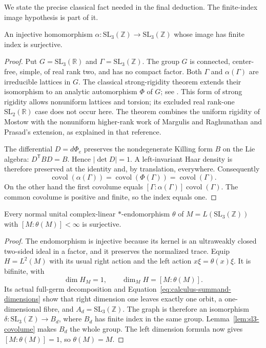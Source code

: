We state the precise classical fact needed in the final deduction.
The finite-index image hypothesis is part of it.
\begin{lemma}\label{lem:sl3-covolume}
An injective homomorphism
$\alpha:\mathrm{SL}_3(\mathbb Z)\to\mathrm{SL}_3(\mathbb Z)$
whose image has finite index is surjective.
\end{lemma}
\begin{proof}
Put $G=\mathrm{SL}_3(\mathbb R)$ and $\Gamma=\mathrm{SL}_3(\mathbb Z)$.
The group $G$ is connected, center-free, simple, of real rank two, and
has no compact factor. Both $\Gamma$ and $\alpha(\Gamma)$ are
irreducible lattices in $G$. The classical strong-rigidity theorem
extends their isomorphism to an analytic automorphism $\Phi$ of $G$;
see \cite[Theorem~B]{Prasad1973}. This form of strong rigidity allows
nonuniform lattices and torsion; its excluded real rank-one
$\mathrm{SL}_2(\mathbb R)$ case does not occur here. The theorem
combines the uniform rigidity of Mostow with the nonuniform higher-rank
work of Margulis and Raghunathan and Prasad's extension, as explained
in that reference.

The differential $D=d\Phi_e$ preserves the nondegenerate Killing form
$B$ on the Lie algebra: $D^{\mathsf T}BD=B$. Hence $|\det D|=1$.
A left-invariant Haar density is therefore preserved at the identity
and, by translation, everywhere. Consequently
\[
 \operatorname{covol}(\alpha(\Gamma))
 =\operatorname{covol}(\Phi(\Gamma))
 =\operatorname{covol}(\Gamma).
\]
On the other hand the first covolume equals
$[\Gamma:\alpha(\Gamma)]\operatorname{covol}(\Gamma)$.
The common covolume is positive and finite, so the index equals one.
\end{proof}

\begin{corollary}\label{cor:sl3-endomorphism}
Every normal unital complex-linear $*$-endomorphism $\theta$ of
$M=L(\mathrm{SL}_3(\mathbb Z))$ with $[M:\theta(M)]<\infty$
is surjective.
\end{corollary}
\begin{proof}
The endomorphism is injective because its kernel is an ultraweakly
closed two-sided ideal in a factor, and it preserves the normalized trace. Equip $H=L^2(M)$ with its usual
right action and the left action $x\xi=\theta(x)\xi$. It is bifinite,
with
\[
 \dim H_M=1,\qquad \dim_M H=[M:\theta(M)].
\]
Its actual full-germ decomposition and
Equation~\eqref{eq:calculus-summand-dimensions} show that right dimension
one leaves exactly one orbit, a one-dimensional fibre, and
$A_d=\mathrm{SL}_3(\mathbb Z)$. The graph is therefore an isomorphism
$\delta:\mathrm{SL}_3(\mathbb Z)\to B_d$, where $B_d$ has finite
index in the same group. Lemma~\ref{lem:sl3-covolume} makes $B_d$ the
whole group. The left dimension formula now gives $[M:\theta(M)]=1$,
so $\theta(M)=M$.
\end{proof}
